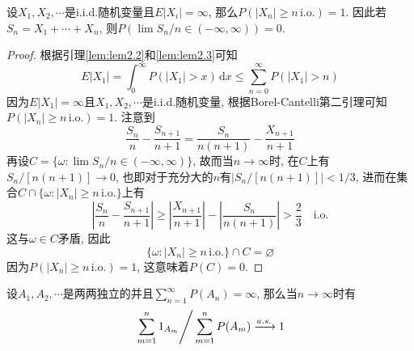 \documentclass[cn, 12pt, math=mtpro2, bibstyle=apa, blue, twocol]{elegantbook}
\let\emptyset\varnothing
\begin{document}
\begin{theorem}
  设$X_1,X_2,\cdots$是i.i.d.随机变量且$E|X_i|=\infty$, 那么$P(|X_n|\geq n\,\text{i.o.})=1$. 因此若$S_n=X_1+\cdots+X_n$, 则$P(\lim S_n/n \in (-\infty,\infty))=0$.
\end{theorem}
\begin{proof}
  根据引理\ref{lem:lem2.2}和\ref{lem:lem2.3}可知
  $$E|X_1|=\int_{0}^{\infty}P(|X_1|>x)\,\text{d}x\leq\sum_{n=0}^{\infty}P(|X_1|>n)$$
  因为$E|X_1|=\infty$且$X_1,X_2,\cdots$是i.i.d.随机变量, 根据Borel-Cantelli第二引理可知$P(|X_n|\geq n\,\text{i.o.})=1$. 注意到
  $$\frac{S_n}{n}-\frac{S_{n+1}}{n+1}=\frac{S_n}{n(n+1)}-\frac{X_{n+1}}{n+1}$$
  再设$C=\{\omega: \lim S_n/n\in (-\infty,\infty)\}$, 故而当$n\to\infty$时, 在$C$上有$S_n/[n(n+1)]\to 0$, 也即对于充分大的$n$有$|S_n/[n(n+1)]|<1/3$, 进而在集合$C\cap \{\omega: |X_n|\geq n\,\text{i.o.}\}$上有
  $$\left|\frac{S_n}{n}-\frac{S_{n+1}}{n+1}\right|\geq \left|\frac{X_{n+1}}{n+1}\right|-\left|\frac{S_n}{n(n+1)}\right|>\frac{2}{3}\quad\text{i.o.}$$
  这与$\omega\in C$矛盾, 因此
  $$\{\omega: |X_n|\geq n\,\text{i.o.}\}\cap C=\emptyset$$
  因为$P(|X_n|\geq n\,\text{i.o.})=1$, 这意味着$P(C)=0$.
\end{proof}
\begin{theorem}\label{thm:thm2.10}
  设$A_1,A_2,\cdots$是两两独立的并且$\sum_{n=1}^{\infty}P(A_n)=\infty$, 那么当$n\to\infty$时有
  $$\left.\sum_{m=1}^{n}1_{A_m}\right/\sum_{m=1}^{n}P(A_m)\xrightarrow{a.s.}1$$
\end{theorem}
\end{document}
